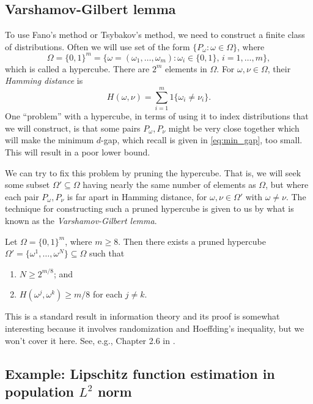 \documentclass{article}
\begin{document}
\subsection{Varshamov-Gilbert lemma}

To use Fano's method or Tsybakov's method, we need to construct a finite class
of distributions. Often we will use set of the form $\{P_\omega : \omega \in
\Omega\}$, where 
\[
\Omega = \{0,1\}^m = \Big\{ \omega = (\omega_1,\dots,\omega_m) : \omega_i \in
\{0,1\}, \, i=1,\dots,m \Big\},
\]
which is called a hypercube. There are $2^m$ elements in $\Omega$. For $\omega,
\nu\in \Omega$, their \emph{Hamming distance} is  
\[
H(\omega,\nu) = \sum_{i=1}^m 1\{ \omega_i \not= \nu_i \}.
\]
One ``problem'' with a hypercube, in terms of using it to index distributions
that we will construct, is that some pairs $P_\omega, P_\nu$ might be very close
together which will make the minimum $d$-gap, which recall is given in
\eqref{eq:min_gap}, too small. This will result in a poor lower bound.  

We can try to fix this problem by pruning the hypercube. That is, we will seek some
subset $\Omega' \subseteq \Omega$ having nearly the same number of elements
as $\Omega$, but where each pair $P_\omega, P_\nu$ is far apart in Hamming
distance, for $\omega, \nu \in \Omega'$ with $\omega \not= \nu$. The technique
for constructing such a pruned hypercube is given to us by what is known as the
\emph{Varshamov-Gilbert lemma}.   

\begin{lemma}
\label{lem:vg}
Let $\Omega = \{0,1\}^m$, where $m \geq 8$. Then there exists a pruned hypercube
$\Omega' = \{ \omega^1,\dots,\omega^N \} \subseteq \Omega$ such that         
\begin{enumerate}
\item $N \geq 2^{m/8}$; and
\item $H(\omega^j,\omega^k) \geq m/8$ for each $j \not= k$.
\end{enumerate}
\end{lemma}

This is a standard result in information theory and its proof is somewhat
interesting because it involves randomization and Hoeffding's inequality, but we
won't cover it here. See, e.g., Chapter 2.6 in \citet{tsybakov2009introduction}.

\subsection{Example: Lipschitz function estimation in population $L^2$ norm}
\end{document}
